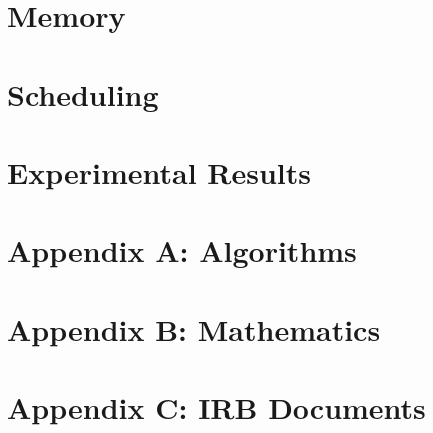 \documentclass[12pt,letterpaper]{lsuetd}
\begin{document}
\chapter{Memory}
\doublespacing

\pagebreak
\singlespacing
\chapter{Scheduling}
\doublespacing

\pagebreak
\singlespacing
\chapter{Experimental Results}
\doublespacing

\pagebreak
\singlespacing
%

%
\doublespacing



\pagebreak
\singlespacing
{}
\appendix
\chapter{Appendix A: Algorithms}
\vspace{0.5em}

\pagebreak
\chapter{Appendix B: Mathematics}
\vspace{0.5em}

\pagebreak

\chapter{Appendix C: IRB Documents}
\vspace{0.5em}

\pagebreak
\end{document}
